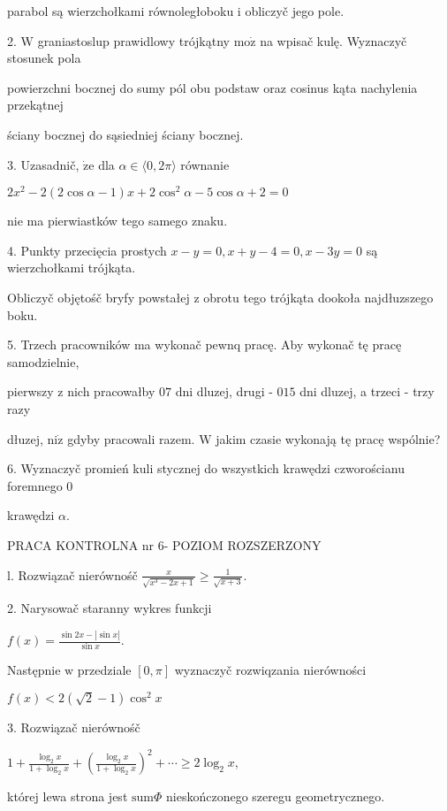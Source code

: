 \documentclass[a4paper,12pt]{article}
\begin{document}
parabol są wierzchołkami równoległoboku $\mathrm{i}$ obliczyč jego pole.

2. $\mathrm{W}$ graniastoslup prawidlowy trójkątny $\mathrm{m}\mathrm{o}\dot{\mathrm{z}}$ na wpisač kulę. Wyznaczyč stosunek pola

powierzchni bocznej do sumy pól obu podstaw oraz cosinus kąta nachylenia przekątnej

ściany bocznej do sąsiedniej ściany bocznej.

3. Uzasadnič, $\dot{\mathrm{z}}\mathrm{e}$ dla $\alpha\in\langle 0,  2\pi\rangle$ równanie

$2x^{2}-2(2\cos\alpha-1)x+2\cos^{2}\alpha-5\cos\alpha+2=0$

nie ma pierwiastków tego samego znaku.

4. Punkty przecięcia prostych $x-y=0, x+y-4=0, x-3y=0$ są wierzchołkami trójkąta.

Obliczyč objętośč bryfy powstałej $\mathrm{z}$ obrotu tego trójkąta dookoła najdłuzszego boku.

5. Trzech pracowników ma wykonač pewnq pracę. Aby wykonač tę pracę samodzielnie,

pierwszy $\mathrm{z}$ nich pracowałby $07$ dni dluzej, drugi - $015$ dni dluzej, a trzeci - trzy razy

dłuzej, $\mathrm{n}\mathrm{i}\dot{\mathrm{z}}$ gdyby pracowali razem. $\mathrm{W}$ jakim czasie wykonają tę pracę wspólnie?

6. Wyznaczyč promień kuli stycznej do wszystkich krawędzi czworościanu foremnego $0$

krawędzi $\alpha.$





PRACA KONTROLNA nr 6- POZIOM ROZSZERZONY

l. Rozwiązač nierównośč $\displaystyle \frac{x}{\sqrt{x^{3}-2x+1}}\geq\frac{1}{\sqrt{x+3}}.$

2. Narysowač staranny wykres funkcji

$f(x)=\displaystyle \frac{\sin 2x-|\sin x|}{\sin x}.$

Następnie $\mathrm{w}$ przedziale $[0,\pi]$ wyznaczyč rozwiqzania nierówności

$f(x)<2(\sqrt{2}-1)\cos^{2}x$

3. Rozwiązač nierównośč

$1+\displaystyle \frac{\log_{2}x}{1+\log_{2}x}+(\frac{\log_{2}x}{1+\log_{2}x})^{2}+\cdots\geq 2\log_{2}x,$

której lewa strona jest $\mathrm{s}\mathrm{u}\mathrm{m}\Phi$ nieskończonego szeregu geometrycznego.
\end{document}
